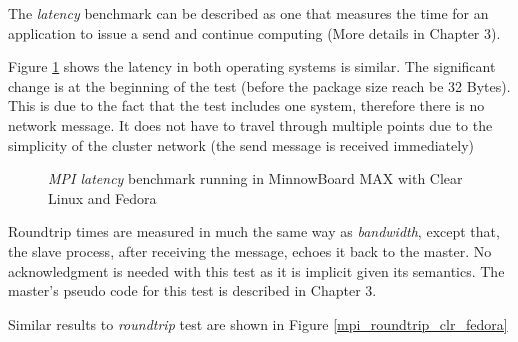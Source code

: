 The \textit{latency} benchmark can be described as one that measures the time
for an application to issue a send and continue computing (More details in
Chapter 3). 

Figure \ref{mpi_latency_clr_fedora} shows the latency in both operating systems
is similar. The significant change is at the beginning of the test (before the
package size reach be 32 Bytes). This is due to the fact that the test includes
one system, therefore there is no network message. It does not have
to travel through multiple points due to the simplicity of the cluster network
(the send message is received immediately) 

\begin{figure}[H]
\begin{center}
\end{center}
\caption{\textit{MPI latency} benchmark running in  MinnowBoard MAX with Clear Linux and
Fedora}
\label{mpi_latency_clr_fedora}
\end{figure}

Roundtrip times are measured in much the same way as \textit{bandwidth}, except
that, the slave process, after receiving the message, echoes it back to the
master. No acknowledgment is needed with this test as it is implicit given its
semantics. The master's pseudo code for this test is described in Chapter 3.

Similar results to \textit{roundtrip} test are shown in Figure \ref{mpi_roundtrip_clr_fedora}

